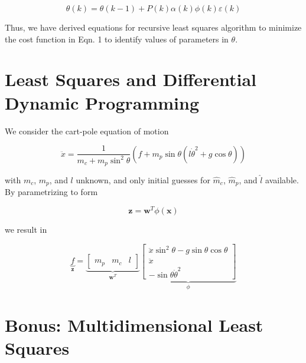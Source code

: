 \documentclass{article}
\begin{document}
\begin{equation}
\theta(k) = \theta(k-1) + P(k) \alpha(k) \phi(k) \varepsilon(k)
\end{equation}

Thus, we have derived equations for recursive least squares algorithm to minimize the cost function in Eqn. 1 to identify values of parameters in $\theta$.

\section{Least Squares and Differential Dynamic Programming}

We consider the cart-pole equation of motion

\begin{equation}
\ddot{x} = \frac{1}{m_c + m_p \sin^2 \theta} (f + m_p \sin \theta (l \dot{\theta}^2 + g \cos \theta))
\end{equation}

with $m_c$, $m_p$, and $l$ unknown, and only initial guesses for $\hat{m}_c$, $\hat{m}_p$, and $\hat{l}$ available. By parametrizing to form

\begin{equation}
\mathbf{z} = \mathbf{w}^T \phi(\mathbf{x})
\end{equation}

we result in

\begin{equation}
\underbrace{f}_{\mathbf{z}} = 
\underbrace{
\begin{bmatrix}
m_p & m_c & l
\end{bmatrix}}_{\mathbf{w}^T}
\underbrace{
\begin{bmatrix}
\ddot{x} \sin^2 \theta - g \sin \theta \cos \theta \\
\ddot{x} \\
- \sin \theta \dot{\theta}^2
\end{bmatrix}}_{\phi}
\end{equation}

\section{Bonus: Multidimensional Least Squares}
\end{document}
